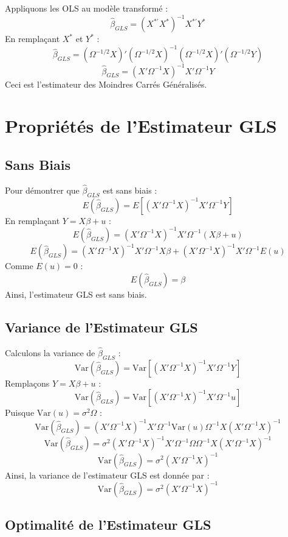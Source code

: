 \documentclass[14pt]{extarticle} %
\theoremstyle{definition}
\theoremstyle{plain}
\begin{document}
Appliquons les OLS au modèle transformé :
\[
\hat{\beta}_{GLS} = (X^{*'} X^*)^{-1} X^{*'} Y^*
\]
En remplaçant \( X^* \) et \( Y^* \) :
\[
\hat{\beta}_{GLS} = (\Omega^{-1/2} X)' (\Omega^{-1/2} X)^{-1} (\Omega^{-1/2} X)' (\Omega^{-1/2} Y)
\]
\[
\hat{\beta}_{GLS} = (X' \Omega^{-1} X)^{-1} X' \Omega^{-1} Y
\]
Ceci est l'estimateur des Moindres Carrés Généralisés.

\section{Propriétés de l'Estimateur GLS}

\subsection{Sans Biais}

Pour démontrer que \(\hat{\beta}_{GLS}\) est sans biais :
\[
E(\hat{\beta}_{GLS}) = E\left[ (X' \Omega^{-1} X)^{-1} X' \Omega^{-1} Y \right]
\]
En remplaçant \( Y = X\beta + u \) :
\[
E(\hat{\beta}_{GLS}) = (X' \Omega^{-1} X)^{-1} X' \Omega^{-1} (X\beta + u)
\]
\[
E(\hat{\beta}_{GLS}) = (X' \Omega^{-1} X)^{-1} X' \Omega^{-1} X \beta + (X' \Omega^{-1} X)^{-1} X' \Omega^{-1} E(u)
\]
Comme \( E(u) = 0 \) :
\[
E(\hat{\beta}_{GLS}) = \beta
\]
Ainsi, l'estimateur GLS est sans biais.

\subsection{Variance de l'Estimateur GLS}

Calculons la variance de \(\hat{\beta}_{GLS}\) :
\[
\text{Var}(\hat{\beta}_{GLS}) = \text{Var}\left[ (X' \Omega^{-1} X)^{-1} X' \Omega^{-1} Y \right]
\]
Remplaçons \( Y = X\beta + u \) :
\[
\text{Var}(\hat{\beta}_{GLS}) = \text{Var}\left[ (X' \Omega^{-1} X)^{-1} X' \Omega^{-1} u \right]
\]
Puisque \( \text{Var}(u) = \sigma^2 \Omega \) :
\[
\text{Var}(\hat{\beta}_{GLS}) = (X' \Omega^{-1} X)^{-1} X' \Omega^{-1} \text{Var}(u) \Omega^{-1} X (X' \Omega^{-1} X)^{-1}
\]
\[
\text{Var}(\hat{\beta}_{GLS}) = \sigma^2 (X' \Omega^{-1} X)^{-1} X' \Omega^{-1} \Omega \Omega^{-1} X (X' \Omega^{-1} X)^{-1}
\]
\[
\text{Var}(\hat{\beta}_{GLS}) = \sigma^2 (X' \Omega^{-1} X)^{-1}
\]
Ainsi, la variance de l'estimateur GLS est donnée par :
\[
\text{Var}(\hat{\beta}_{GLS}) = \sigma^2 (X' \Omega^{-1} X)^{-1}
\]

\subsection{Optimalité de l'Estimateur GLS}
\end{document}
